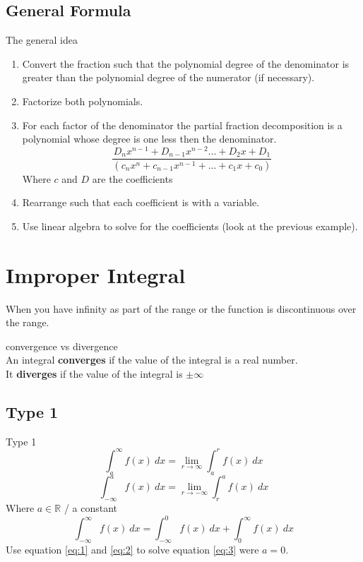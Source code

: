 \documentclass[letterpaper,10pt,twoside,twocolumn,openany]{book}
\begin{document}
\subsection{General Formula}
\begin{paperbox}{The general idea}\\
    \begin{enumerate}
        \item Convert the fraction such that the polynomial degree of the denominator is greater than the polynomial degree of the numerator (if necessary).
        \item Factorize both polynomials.
        \item For each factor of the denominator the partial fraction decomposition is a polynomial whose degree is one less then the denominator. 
        \begin{equation}
            \frac{D_nx^{n-1} + D_{n-1}x^{n-2}... + D_2x + D_1}{(c_nx^n + c_{n-1}x^{n-1} + ... + c_1x + c_0)}
        \end{equation} 
        Where $c$ and $D$ are the coefficients
        \item Rearrange such that each coefficient is with a variable.
        \item Use linear algebra to solve for the coefficients (look at the previous example).
    \end{enumerate}
    
\end{paperbox}



\section{Improper Integral}
When you have infinity as part of the range or the function is discontinuous over the range.
\begin{paperbox}{convergence vs divergence}\\
    An integral \textbf{converges} if the value of the integral is a real number.\\ 
    It \textbf{diverges} if the value of the integral is $\pm\infty$
\end{paperbox}

\subsection{Type 1}
\begin{paperbox}{Type 1}
    \begin{equation} \label{eq:1}
        \int_a^\infty f(x)\ dx = \lim_{r \to \infty} \int_a^r f(x)\ dx
    \end{equation}
    \begin{equation} \label{eq:2}
        \int_{-\infty}^a f(x)\ dx = \lim_{r \to -\infty} \int_r^a f(x)\ dx
    \end{equation}
    {\center Where $a\in \mathbb{R}$ / a constant} 
    \begin{equation} \label{eq:3}
        \int_{-\infty}^\infty f(x)\ dx = \int_{-\infty}^0 f(x)\ dx + \int_0^\infty f(x)\ dx 
    \end{equation}
    Use equation \ref{eq:1} and \ref{eq:2} to solve equation \ref{eq:3} were $a = 0$.
\end{paperbox}
\newpage
\end{document}
